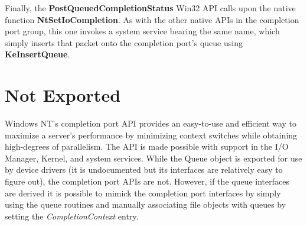 \documentclass[a4paper,12pt,notitlepage,twoside,openright]{article}
\begin{document}
Finally, the \textbf{PostQueuedCompletionStatus} Win32 API calls upon the native function \textbf{NtSetIoCompletion}. As with the other native APIs in the completion port group, this one invokes a system service bearing the same name, which simply inserts that packet onto the completion port's queue using \textbf{KeInsertQueue}.

\section{Not Exported}

Windows NT's completion port API provides an easy-to-use and efficient way to maximize a server's performance by minimizing context switches while obtaining high-degrees of parallelism. The API is made possible with support in the I/O Manager, Kernel, and system services. While the Queue object is exported for use by device drivers (it is undocumented but its interfaces are relatively easy to figure out), the completion port APIs are not. However, if the queue interfaces are derived it is possible to mimick the completion port interfaces by simply using the queue routines and manually associating file objects with queues by setting the \emph{CompletionContext} entry.
\end{document}
